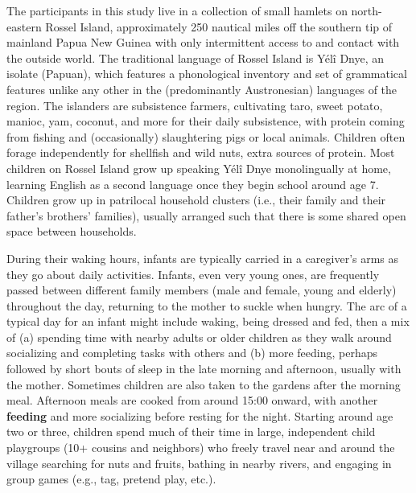 \documentclass[,man,floatsintext]{apa6}
\begin{document}
The participants in this study live in a collection of small hamlets on
north-eastern Rossel Island, approximately 250 nautical miles off the
southern tip of mainland Papua New Guinea with only intermittent access
to and contact with the outside world. The traditional language of
Rossel Island is Yélî Dnye, an isolate (Papuan), which features a
phonological inventory and set of grammatical features unlike any other
in the (predominantly Austronesian) languages of the region. The
islanders are subsistence farmers, cultivating taro, sweet potato,
manioc, yam, coconut, and more for their daily subsistence, with protein
coming from fishing and (occasionally) slaughtering pigs or local
animals. Children often forage independently for shellfish and wild
nuts, extra sources of protein. Most children on Rossel Island grow up
speaking Yélî Dnye monolingually at home, learning English as a second
language once they begin school around age 7. Children grow up in
patrilocal household clusters (i.e., their family and their father's
brothers' families), usually arranged such that there is some shared
open space between households.

During their waking hours, infants are typically carried in a
caregiver's arms as they go about daily activities. Infants, even very
young ones, are frequently passed between different family members (male
and female, young and elderly) throughout the day, returning to the
mother to suckle when hungry. The arc of a typical day for an infant
might include waking, being dressed and fed, then a mix of (a) spending
time with nearby adults or older children as they walk around
socializing and completing tasks with others and (b) more feeding,
perhaps followed by short bouts of sleep in the late morning and
afternoon, usually with the mother. Sometimes children are also taken to
the gardens after the morning meal. Afternoon meals are cooked from
around 15:00 onward, with another \textbf{feeding} and more socializing
before resting for the night. Starting around age two or three, children
spend much of their time in large, independent child playgroups (10+
cousins and neighbors) who freely travel near and around the village
searching for nuts and fruits, bathing in nearby rivers, and engaging in
group games (e.g., tag, pretend play, etc.).
\end{document}
